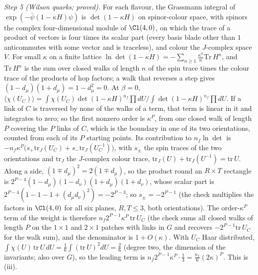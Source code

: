 \emph{Step 5 (Wilson quarks; proved).} For each flavour, the Grassmann integral of $\exp(-\bar\psi(1 - \kappa H)\psi)$ is $\det(1 - \kappa H)$ on spinor-colour space, with spinors the complex four-dimensional module of $\Cl(4,0)$, on which the trace of a product of vectors is four times its scalar part (every basis blade other than $1$ anticommutes with some vector and is traceless), and colour the $J$-complex space $V$. For small $\kappa$ on a finite lattice $\ln\det(1 - \kappa H) = -\sum_{n \ge 1}\tfrac{\kappa^{n}}{n}\mathrm{Tr}\,H^{n}$, and $\mathrm{Tr}\,H^{n}$ is the sum over closed walks of length $n$ of the spin trace times the colour trace of the products of hop factors; a walk that reverses a step gives $(1 - d_{\mu})(1 + d_{\mu}) = 1 - d_{\mu}^{2} = 0$. At $\beta = 0$, $\langle\chi(U_{C})\rangle = \int\chi(U_{C})\det(1 - \kappa H)^{n_{f}}\prod dU/\int\det(1 - \kappa H)^{n_{f}}\prod dU$. If a link of $C$ is traversed by none of the walks of a term, that term is linear in it and integrates to zero; so the first nonzero order is $\kappa^{P}$, from one closed walk of length $P$ covering the $P$ links of $C$, which is the boundary in one of its two orientations, counted from each of its $P$ starting points. Its contribution to $n_{f}\ln\det$ is $-n_{f}\kappa^{P}\bigl(s_{+}\mathrm{tr}_{J}(U_{C}) + s_{-}\mathrm{tr}_{J}(U_{C}^{-1})\bigr)$, with $s_{\pm}$ the spin traces of the two orientations and $\mathrm{tr}_{J}$ the $J$-complex colour trace, $\mathrm{tr}_{J}(U) + \mathrm{tr}_{J}(U^{-1}) = \mathrm{tr}\,U$. Along a side, $(1 \mp d_{\mu})^{2} = 2(1 \mp d_{\mu})$, so the product round an $R \times T$ rectangle is $2^{P - 4}(1 - d_{\mu})(1 - d_{\nu})(1 + d_{\mu})(1 + d_{\nu})$, whose scalar part is $2^{P - 4}(1 - 1 - 1 + (d_{\mu}d_{\nu})^{2}) = -2^{P - 3}$; so $s_{\pm} = -2^{P - 1}$ (the check multiplies the factors in $\Cl(4,0)$ for all six planes, $R, T \le 3$, both orientations). The order-$\kappa^{P}$ term of the weight is therefore $n_{f}2^{P - 1}\kappa^{P}\,\mathrm{tr}\,U_{C}$ (the check sums all closed walks of length $P$ on the $1 \times 1$ and $2 \times 1$ patches with links in $G$ and recovers $-2^{P - 1}\mathrm{tr}\,U_{C}$ for the walk sum), and the denominator is $1 + O(\kappa)$. With $U_{C}$ Haar distributed, $\int\chi(U)\,\mathrm{tr}\,U\,dU = \tfrac16\int(\mathrm{tr}\,U)^{2}dU = \tfrac26$ (degree two, the dimension of the invariants; also over $G$), so the leading term is $n_{f}2^{P - 1}\kappa^{P}\cdot\tfrac13 = \tfrac{n_{f}}{6}(2\kappa)^{P}$. This is (iii).


